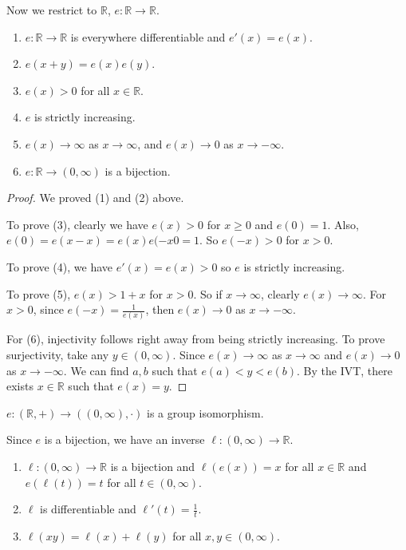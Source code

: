 Now we restrict to \(\mathbb{R}\), \(e: \mathbb{R} \to \mathbb{R}\).
\begin{theorem}{}{}
    \begin{enumerate}
        \item \(e: \mathbb{R}\to \mathbb{R}\) is everywhere differentiable and \(e'(x) = e(x)\).
        \item \(e(x + y) = e(x) e(y)\).
        \item \(e(x) > 0\) for all \(x \in \mathbb{R}\).
        \item \(e\) is strictly increasing.
        \item \(e(x) \to \infty\) as \(x \to \infty \), and \(e(x) \to 0\) as \(x \to -\infty \).
        \item \(e: \mathbb{R} \to (0, \infty )\) is a bijection.
    \end{enumerate}
\end{theorem}
\begin{proof}
    We proved (1) and (2) above.

    To prove (3), clearly we have \(e(x) > 0\) for \(x \geq 0\) and \(e(0) = 1\). Also, \(e(0) = e(x - x) = e(x) e(-x0 = 1\). So \(e(-x) > 0\) for \(x > 0\).

    To prove (4), we have \(e'(x) = e(x) > 0\) so \(e\) is strictly increasing.
    
    To prove (5), \(e(x) > 1 + x\) for \(x > 0\). So if \(x \to \infty \), clearly \(e(x) \to \infty \). For \(x > 0\), since \(e(-x) = \frac{1}{e(x)}\), then \(e(x) \to 0\) as \(x \to -\infty \).
    
    For (6), injectivity follows right away from being strictly increasing. To prove surjectivity, take any \(y \in (0, \infty)\). Since \(e(x) \to \infty\) as \(x \to \infty \) and \(e(x) \to 0\) as \(x \to -\infty \). We can find \(a, b\) such that \(e(a) < y < e(b)\). By the IVT, there exists \(x \in \mathbb{R}\) such that \(e(x) = y\).
\end{proof}
\begin{remark}
    \(e: (\mathbb{R}, +) \to ((0, \infty), \cdot)\) is a group isomorphism.
\end{remark}
Since \(e\) is a bijection, we have an inverse \(\ell: (0, \infty) \to \mathbb{R}\).
\begin{theorem}{}{}
   \begin{enumerate}
       \item \(\ell: (0, \infty) \to \mathbb{R}\) is a bijection and \(\ell(e(x)) = x\) for all \(x \in \mathbb{R}\) and \(e(\ell(t)) = t\) for all \(t \in (0, \infty)\).
       \item \(\ell\) is differentiable and \(\ell'(t) = \frac{1}{t}\).
       \item \(\ell(xy) = \ell(x) + \ell(y)\) for all \(x, y \in (0, \infty)\).
   \end{enumerate} 
\end{theorem}
